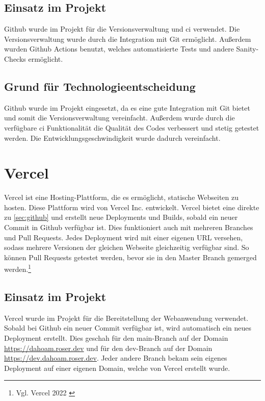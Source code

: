 \subsection{Einsatz im Projekt}
\label{sub:github-use}

Github wurde im Projekt für die Versionsverwaltung und \gls{ci} verwendet.
Die Versionsverwaltung wurde durch die Integration mit Git ermöglicht.
Außerdem wurden Github Actions benutzt, welches automatisierte Tests und andere Sanity-Checks ermöglicht.

\subsection{Grund für Technologieentscheidung}
\label{sub:github-reason}

Github wurde im Projekt eingesetzt, da es eine gute Integration mit Git bietet und somit die Versionsverwaltung vereinfacht.
Außerdem wurde durch die verfügbare \gls{ci} Funktionalität die Qualität des Codes verbessert und stetig getestet werden.
Die Entwicklungsgeschwindigkeit wurde dadurch vereinfacht.

\section{Vercel}
\label{sec:vercel}

Vercel ist eine Hosting-Plattform, die es ermöglicht, statische Webseiten zu hosten.
Diese Plattform wird von Vercel Inc. entwickelt.
Vercel bietet eine direkte zu \ref{sec:github} und erstellt neue Deployments und Builds, sobald ein neuer Commit in Github verfügbar ist.
Dies funktioniert auch mit mehreren Branches und Pull Requests. Jedes Deployment wird mit einer eigenen URL versehen, sodass mehrere Versionen der gleichen Webseite gleichzeitig verfügbar sind.
So können Pull Requests getestet werden, bevor sie in den Master Branch gemerged werden.\footnote{Vgl. Vercel 2022 \cite{vercel2022}}

\subsection{Einsatz im Projekt}
\label{sub:vercel-use}

Vercel wurde im Projekt für die Bereitstellung der Webanwendung verwendet.
Sobald bei Github ein neuer Commit verfügbar ist, wird automatisch ein neues Deployment erstellt.
Dies geschah für den main-Branch auf der Domain \url{https://dahoam.roser.dev} und für den dev-Branch auf der Domain \url{https://dev.dahoam.roser.dev}.
Jeder andere Branch bekam sein eigenes Deployment auf einer eigenen Domain, welche von Vercel erstellt wurde.

